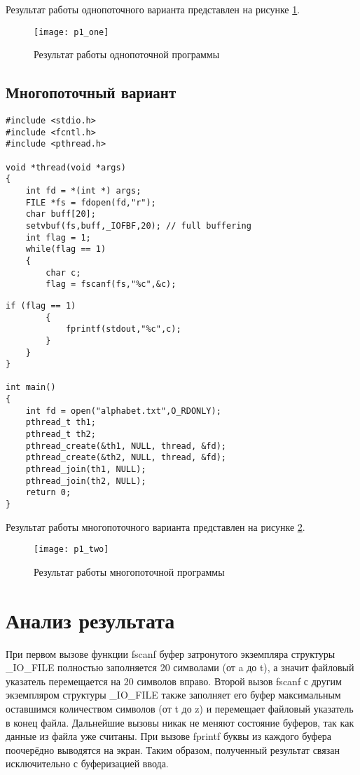 Результат работы однопоточного варианта представлен на рисунке \ref{p1_one}.

\begin{figure}[ht!]
	\centering
	\texttt{[image: p1\_one]}
	\caption{Результат работы однопоточной программы}
	\label{p1_one}
\end{figure}

\subsection*{Многопоточный вариант}

\begin{lstlisting}[caption=Многопоточный вариант]
#include <stdio.h>
#include <fcntl.h>
#include <pthread.h>

void *thread(void *args)
{
	int fd = *(int *) args;
	FILE *fs = fdopen(fd,"r");
	char buff[20];
	setvbuf(fs,buff,_IOFBF,20); // full buffering
	int flag = 1;
	while(flag == 1)
	{
		char c;
		flag = fscanf(fs,"%c",&c);
\end{lstlisting}		
\begin{lstlisting}[caption=Многопоточный вариант]
		if (flag == 1) 
		{
			fprintf(stdout,"%c",c);
		}
	}
}

int main()
{
	int fd = open("alphabet.txt",O_RDONLY);
	pthread_t th1;
	pthread_t th2;
	pthread_create(&th1, NULL, thread, &fd);
	pthread_create(&th2, NULL, thread, &fd);
	pthread_join(th1, NULL);
	pthread_join(th2, NULL);
	return 0;
}
\end{lstlisting}

Результат работы многопоточного варианта представлен на рисунке \ref{p1_two}.

\begin{figure}[ht!]
	\centering
	\texttt{[image: p1\_two]}
	\caption{Результат работы многопоточной программы}
	\label{p1_two}
\end{figure}

\section*{Анализ результата}

При первом вызове функции fscanf буфер затронутого экземпляра структуры \_IO\_FILE полностью заполняется 20 символами (от a до t), а значит файловый указатель перемещается на 20 символов вправо. Второй вызов fscanf с другим экземпляром структуры \_IO\_FILE также заполняет его буфер максимальным оставшимся количеством символов (от t до z) и перемещает файловый указатель в конец файла. Дальнейшие вызовы никак не меняют состояние буферов, так как данные из файла уже считаны. При вызове fprintf буквы из каждого буфера поочерёдно выводятся на экран. Таким образом, полученный результат связан исключительно с буферизацией ввода.


